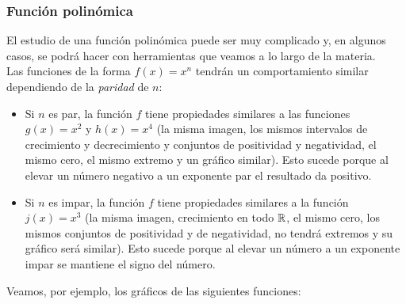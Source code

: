 \documentclass[../Teoría.root.tex]{subfiles}
\begin{document}
\subsubsection{Función polinómica}
El estudio de una función polinómica puede ser muy complicado y, en algunos casos, se podrá hacer con herramientas que veamos a lo largo de la materia.\\
Las funciones de la forma \(f(x) = x^n\) tendrán un comportamiento similar dependiendo de la \textit{paridad} de \(n\):
\begin{itemize}
    \item Si \(n\) es par, la función \(f\) tiene propiedades similares a las funciones \(g(x) = x^2\) y \(h(x) = x^4\) (la misma imagen, los mismos intervalos de crecimiento y decrecimiento y conjuntos de positividad y negatividad, el mismo cero, el mismo extremo y un gráfico similar).
          Esto sucede porque al elevar un número negativo a un exponente par el resultado da positivo.
    \item Si \(n\) es impar, la función \(f\) tiene propiedades similares a la función \(j(x) = x^3\) (la misma imagen, crecimiento en todo \(\mathbb{R}\), el mismo cero, los mismos conjuntos de positividad y de negatividad, no tendrá extremos y su gráfico será similar).
          Esto sucede porque al elevar un número a un exponente impar se mantiene el signo del número.
\end{itemize}
Veamos, por ejemplo, los gráficos de las siguientes funciones:
\end{document}
